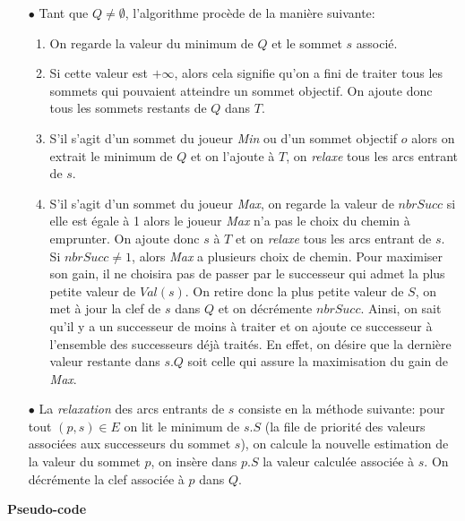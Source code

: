 \begin{enumerate}
	\item[$\bullet$] Tant que $Q \neq \emptyset$, l'algorithme procède de la manière suivante: 
	\begin{enumerate}
		\item On regarde la valeur du minimum de $Q$ et le sommet $s$ associé.
		\item Si cette valeur est $+\infty$, alors cela signifie qu'on a fini de traiter tous les sommets qui pouvaient atteindre un sommet objectif. On ajoute donc tous les sommets restants de $Q$ dans $T$.
		\item S'il s'agit d'un sommet du joueur \textit{Min} ou d'un sommet objectif $o$ alors on extrait le minimum de $Q$ et on l'ajoute à $T$, on \textit{relaxe} tous les arcs entrant de $s$.
		\item S'il s'agit d'un sommet du joueur \textit{Max}, on regarde la valeur de $nbrSucc$ si elle est égale à 1 alors le joueur \textit{Max} n'a pas le choix du chemin à emprunter. On ajoute donc $s$ à $T$ et on \textit{relaxe} tous les arcs entrant de $s$. Si $nbrSucc \neq 1$, alors \textit{Max} a plusieurs choix de chemin. Pour maximiser son gain, il ne choisira pas de passer par le successeur qui admet la plus petite valeur de $Val(s)$. On retire donc la plus petite valeur de $S$, on met à jour la clef de $s$ dans $Q$ et on décrémente $nbrSucc$. Ainsi, on sait qu'il y a un successeur de moins à traiter et on ajoute ce successeur à l'ensemble des successeurs déjà traités. En effet, on désire que la dernière valeur restante dans $s.Q$ soit celle qui assure la maximisation du gain de \textit{Max}.
	\end{enumerate}
	
	\item[$\bullet$] La \textit{relaxation} des arcs entrants de $s$ consiste en la méthode suivante: pour tout $(p,s)\in E$ on lit le minimum de $s.S$ (la file de priorité des valeurs associées aux successeurs du sommet $s$), on calcule la nouvelle estimation de la valeur du sommet $p$, on insère dans $p.S$ la valeur calculée associée à $s$. On décrémente la clef associée à $p$ dans $Q$.
	
\end{enumerate}

\noindent \textbf{Pseudo-code}\\

